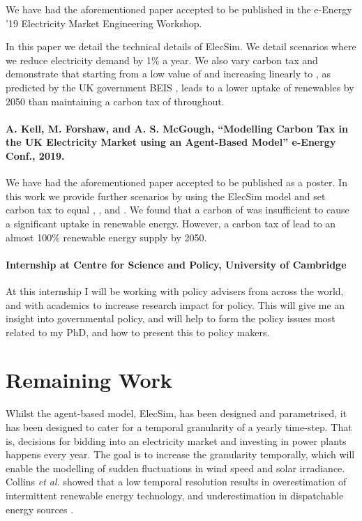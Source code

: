 \documentclass[12pt]{article}
\begin{document}
We have had the aforementioned paper accepted to be published in the e-Energy '19 Electricity Market Engineering Workshop.

In this paper we detail the technical details of ElecSim. We detail scenarios where we reduce electricity demand by 1\% a year. We also vary carbon tax and demonstrate that starting from a low value of  and increasing linearly to , as predicted by the UK government BEIS \cite{Department2016}, leads to a lower uptake of renewables by 2050 than maintaining a carbon tax of  throughout.

\paragraph{A. Kell, M. Forshaw, and A. S. McGough, “Modelling Carbon Tax in the UK Electricity Market using an Agent-Based Model” e-Energy Conf., 2019.}

We have had the aforementioned paper accepted to be published as a poster. In this work we provide further scenarios by using the ElecSim model and set carbon tax to equal , , and . We found that a carbon of  was insufficient to cause a significant uptake in renewable energy. However, a carbon tax of  lead to an almost 100\% renewable energy supply by 2050.


\paragraph{Internship at Centre for Science and Policy, University of Cambridge}

At this internship I will be working with policy advisers from across the world, and with academics to increase research impact for policy. This will give me an insight into governmental policy, and will help to form the policy issues most related to my PhD, and how to present this to policy makers.

\clearpage

\section{Remaining Work}

Whilst the agent-based model, ElecSim, has been designed and parametrised, it has been designed to cater for a temporal granularity of a yearly time-step. That is, decisions for bidding into an electricity market and investing in power plants happens every year. The goal is to increase the granularity temporally, which will enable the modelling of sudden fluctuations in wind speed and solar irradiance. Collins \textit{et al.} showed that a low temporal resolution results in overestimation of intermittent renewable energy technology, and underestimation in dispatchable energy sources \cite{Collins2017}.
\end{document}
